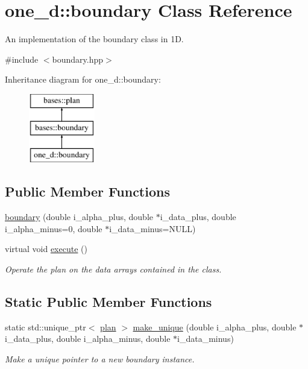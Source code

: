\hypertarget{classone__d_1_1boundary}{\section{one\-\_\-d\-:\-:boundary Class Reference}
\label{classone__d_1_1boundary}
}


An implementation of the boundary class in 1\-D.  




{\ttfamily \#include $<$boundary.\-hpp$>$}

Inheritance diagram for one\-\_\-d\-:\-:boundary\-:\begin{figure}[H]
\begin{center}
\leavevmode
\includegraphics[height=3.000000cm]{classone__d_1_1boundary}
\end{center}
\end{figure}
\subsection*{Public Member Functions}
\begin{DoxyCompactItemize}
\item 
\hyperlink{classone__d_1_1boundary_a87b18a245dddef3a3cd750a20e053d5a}{boundary} (double i\-\_\-alpha\-\_\-plus, double $\ast$i\-\_\-data\-\_\-plus, double i\-\_\-alpha\-\_\-minus=0, double $\ast$i\-\_\-data\-\_\-minus=N\-U\-L\-L)
\begin{DoxyCompactList}\small\item\em \end{DoxyCompactList}\item 
virtual void \hyperlink{classone__d_1_1boundary_a4cfcd08523efc736c2114bab31729078}{execute} ()
\begin{DoxyCompactList}\small\item\em Operate the plan on the data arrays contained in the class. \end{DoxyCompactList}\end{DoxyCompactItemize}
\subsection*{Static Public Member Functions}
\begin{DoxyCompactItemize}
\item 
static std\-::unique\-\_\-ptr$<$ \hyperlink{classbases_1_1plan_a7b4ddc2f876b9e4dcf899feb20ae369f}{plan} $>$ \hyperlink{classone__d_1_1boundary_ab177f69ed96a53083e134004e2d50f18}{make\-\_\-unique} (double i\-\_\-alpha\-\_\-plus, double $\ast$i\-\_\-data\-\_\-plus, double i\-\_\-alpha\-\_\-minus, double $\ast$i\-\_\-data\-\_\-minus)
\begin{DoxyCompactList}\small\item\em Make a unique pointer to a new boundary instance. \end{DoxyCompactList}\end{DoxyCompactItemize}
